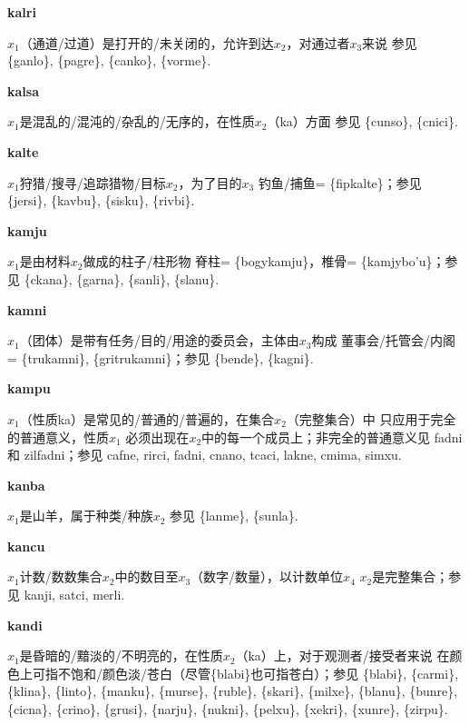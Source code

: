 \documentclass[notitlepage,twocolumn,a4paper,10pt]{book}
\begin{document}
{\sffamily\bfseries kalri}\enspace {\ttfamily\bfseries[kar]}  $x_1$（通道\slash{}过道）是打开的\slash{}未关闭的，允许到达$x_2$，对通过者$x_3$来说 \textemdash{} 参见 \{ganlo\}, \{pagre\}, \{canko\}, \{vorme\}.

{\sffamily\bfseries kalsa}\enspace {\ttfamily\bfseries[kas]}  $x_1$是混乱的\slash{}混沌的\slash{}杂乱的\slash{}无序的，在性质$x_2$（ka）方面 \textemdash{} 参见 \{cunso\}, \{cnici\}.

{\sffamily\bfseries kalte}\enspace {\ttfamily\bfseries[kat]}  $x_1$狩猎\slash{}搜寻\slash{}追踪猎物\slash{}目标$x_2$，为了目的$x_3$ \textemdash{} 钓鱼\slash{}捕鱼= \{fipkalte\}；参见 \{jersi\}, \{kavbu\}, \{sisku\}, \{rivbi\}.

{\sffamily\bfseries kamju} $x_1$是由材料$x_2$做成的柱子\slash{}柱形物 \textemdash{} 脊柱= \{bogykamju\}，椎骨= \{kamjybo'u\}；参见 \{ckana\}, \{garna\}, \{sanli\}, \{slanu\}.

{\sffamily\bfseries kamni} $x_1$（团体）是带有任务\slash{}目的\slash{}用途的委员会，主体由$x_3$构成 \textemdash{} 董事会\slash{}托管会\slash{}内阁= \{trukamni\}, \{gritrukamni\}；参见 \{bende\}, \{kagni\}.

{\sffamily\bfseries kampu}\enspace {\ttfamily\bfseries[        kau]}  $x_1$（性质ka）是常见的\slash{}普通的\slash{}普遍的，在集合$x_2$（完整集合）中 \textemdash{} 只应用于完全的普通意义，性质$x_1$ 必须出现在$x_2$中的每一个成员上；非完全的普通意义见 {fadni} 和 {zilfadni}；参见 {cafne}, {rirci}, {fadni}, {cnano}, {tcaci}, {lakne}, {cmima}, {simxu}.

{\sffamily\bfseries kanba} $x_1$是山羊，属于种类\slash{}种族$x_2$ \textemdash{} 参见 \{lanme\}, \{sunla\}.

{\sffamily\bfseries kancu}\enspace {\ttfamily\bfseries[kac]}  $x_1$计数\slash{}数数集合$x_2$中的数目至$x_3$（数字\slash{}数量），以计数单位$x_4$ \textemdash{} $x_2$是完整集合；参见 {kanji}, {satci}, {merli}.

{\sffamily\bfseries kandi}\enspace {\ttfamily\bfseries[kad]}  $x_1$是昏暗的\slash{}黯淡的\slash{}不明亮的，在性质$x_2$（ka）上，对于观测者\slash{}接受者来说 \textemdash{} 在颜色上可指不饱和\slash{}颜色淡\slash{}苍白（尽管\{blabi\}也可指苍白）；参见 \{blabi\}, \{carmi\}, \{klina\}, \{linto\}, \{manku\}, \{murse\}, \{ruble\}, \{skari\}, \{milxe\}, \{blanu\}, \{bunre\}, \{cicna\}, \{crino\}, \{grusi\}, \{narju\}, \{nukni\}, \{pelxu\}, \{xekri\}, \{xunre\}, \{zirpu\}.
\end{document}

